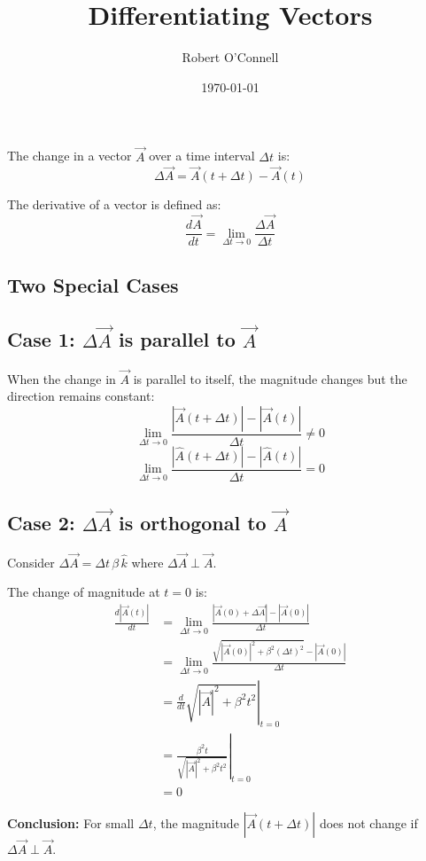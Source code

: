 \documentclass{article}
\title{\textbf{Differentiating Vectors}}
\author{Robert O'Connell}
\date{\today}
\begin{document}
\maketitle

The change in a vector $\vec{A}$ over a time interval $\Delta t$ is:
\[
\Delta \vec{A} = \vec{A}(t+ \Delta t) - \vec{A}(t)
\]

The derivative of a vector is defined as:
\[
\frac{d\vec{A}}{dt} = \lim_{\Delta t\to 0}\frac{\Delta\vec{A}}{\Delta t}
\]

\subsection*{Two Special Cases}

\subsection*{Case 1: $\Delta \vec{A}$ is parallel to $\vec{A}$}

When the change in $\vec{A}$ is parallel to itself, the magnitude changes but the direction remains constant:
\[
\lim_{\Delta t \to 0}\frac{|\vec{A}(t+\Delta t)| - |\vec{A}(t)|}{\Delta t} \neq 0
\]
\[
\lim_{\Delta t \to 0}\frac{|\hat{A}(t+\Delta t)| - |\hat{A}(t)|}{\Delta t} = 0
\]

\subsection*{Case 2: $\Delta \vec{A}$ is orthogonal to $\vec{A}$}

Consider $\Delta \vec{A} = \Delta t \, \beta \, \hat{k}$ where $\Delta \vec{A} \perp \vec{A}$.

The change of magnitude at $t = 0$ is:
\begin{align*}
    \frac{d|\vec{A}(t)|}{dt} 
    &= \lim_{\Delta t\to0}\frac{|\vec{A}(0) + \Delta \vec{A}| - |\vec{A}(0)|}{\Delta t} \\[0.5em]
    &= \lim_{\Delta t \to0}\frac{\sqrt{|\vec{A}(0)|^2 + \beta^2(\Delta t)^2} - |\vec{A}(0)|}{\Delta t} \\[0.5em]
    &= \left.\frac{d}{dt}\sqrt{|\vec{A}|^2 + \beta^2t^2}\right|_{t=0} \\[0.5em]
    &= \left.\frac{\beta^2t}{\sqrt{|\vec{A}|^2 + \beta^2t^2}}\right|_{t=0} \\[0.5em]
    &= 0
\end{align*}

\textbf{Conclusion:} For small $\Delta t$, the magnitude $|\vec{A}(t + \Delta t)|$ does not change if $\Delta \vec{A} \perp \vec{A}$.
\end{document}
